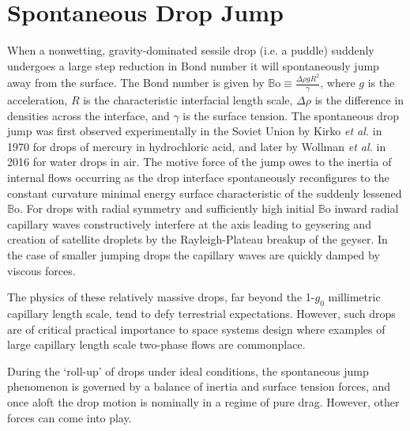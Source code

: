 \documentclass[aip,reprint, floatfix]{revtex4-1}
\begin{document}
\pacs{}%

\maketitle %

\section{Spontaneous Drop Jump}
When a nonwetting, gravity-dominated sessile drop (i.e. a puddle) suddenly undergoes a large step reduction in Bond number it will spontaneously jump away from the surface. The Bond number is given by $\mathbb{B}\mbox{o} \equiv \frac{\Delta \rho g R^2}{\gamma}$, where $g$ is the acceleration, $R$ is the characteristic interfacial length scale, $\Delta \rho$ is the difference in densities across the interface, and $\gamma$ is the surface tension. The spontaneous drop jump was first observed experimentally in the Soviet Union by Kirko \emph{et al.} \cite{kirko_phenomenon_1970} in 1970 for drops of mercury in hydrochloric acid, and later by Wollman \emph{et al.} \cite{wollman_more_2016} in 2016 for water drops in air. The motive force of the jump owes to the inertia of internal flows occurring as the drop interface spontaneously reconfigures to the constant curvature minimal energy surface characteristic of the suddenly lessened $\mathbb{B}\mbox{o}$. For drops with radial symmetry and sufficiently high initial $\mathbb{B}\mbox{o}$ inward radial capillary waves constructively interfere at the axis leading to geysering and creation of satellite droplets by the Rayleigh-Plateau breakup of the geyser. In the case of smaller jumping drops the capillary waves are quickly damped by viscous forces.

The physics of these relatively massive drops, far beyond the 1-$g_0$ millimetric capillary length scale, tend to defy terrestrial expectations. However, such drops are of critical practical importance to space systems design where examples of large capillary length scale two-phase flows are commonplace.

During the `roll-up' of drops under ideal conditions, the spontaneous jump phenomenon is governed by a balance of inertia and surface tension forces, and once aloft the drop motion is nominally in a regime of pure drag. However, other forces can come into play. 
\end{document}
